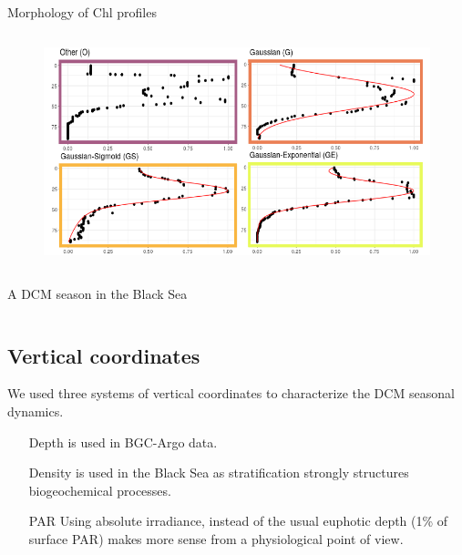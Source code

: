 \documentclass[final]{beamer}
\begin{document}
\begin{frame}[fragile]
\begin{columns}[T]
\begin{column}{.64\textwidth}
\begin{block}{Morphology of Chl profiles}
\begin{columns}[T]
	    \begin{column}{.32\textwidth}
	      	\begin{figure}
     		 \includegraphics[width=.9\columnwidth]{figs/DCMforms_DCM.png}
		    \end{figure}
	    \end{column}	    
	  \end{columns}
	  
	\end{block}
	
	\begin{block}{ A DCM season in the Black Sea }
\vskip -12mm
	  \begin{columns}[T]
	    \begin{column}{.20\textwidth}
	    \subsection{Vertical coordinates}
	    We used three systems of vertical coordinates to characterize the DCM seasonal dynamics.
        \begin{itemize}[wide, labelwidth=!,labelindent=0pt]
          \item[\alert{Depth}] is used in BGC-Argo data.
          \item[\alert{Density}] is used in the Black Sea as  stratification strongly structures biogeochemical processes. 
          \item[\alert{PAR}] Using absolute irradiance, instead of the usual euphotic depth (1\% of surface PAR) makes more sense from a physiological point of view. 
        \end{itemize}


\end{column}
\end{columns}
\end{block}
\end{column}
\end{columns}
\end{frame}
\end{document}
